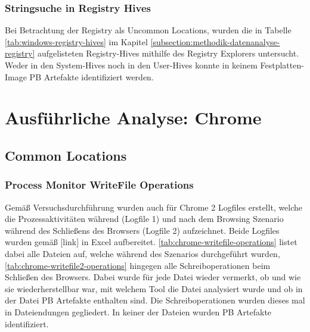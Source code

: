 \begin{appendices}
		
		\subsubsection*{Stringsuche in Registry Hives}
		Bei Betrachtung der Registry als Uncommon Locations, wurden die in Tabelle \ref{tab:windows-registry-hives} im Kapitel \ref{subsection:methodik-datenanalyse-registry} aufgelisteten Registry-Hives mithilfe des Registry Explorers untersucht. 
		Weder in den System-Hives noch in den User-Hives konnte in keinem Festplatten-Image PB Artefakte identifiziert werden. 

\section{Ausführliche Analyse: Chrome}
\subsection{Common Locations}
\label{subsection:appendix-chrome-common-locations}
\subsubsection*{Process Monitor WriteFile Operations}
\label{subsubsection:appendix-chrome-common-locations-writefile-operations}

Gemäß Versuchsdurchführung wurden auch für Chrome 2 Logfiles erstellt, welche die Prozessaktivitäten während (Logfile 1) und nach dem Browsing Szenario während des Schließens des Browsers (Logfile 2) aufzeichnet. Beide Logfiles wurden gemäß [link] in Excel aufbereitet. \autoref{tab:chrome-writefile-operations} listet dabei alle Dateien auf, welche während des Szenarios durchgeführt wurden, \autoref{tab:chrome-writefile2-operations} hingegen alle Schreiboperationen beim Schließen des Browsers. Dabei wurde für jede Datei wieder vermerkt, ob und wie sie wiederherstellbar war, mit welchem Tool die Datei analysiert wurde und ob in der Datei PB Artefakte enthalten sind. Die Schreiboperationen wurden dieses mal in Dateiendungen gegliedert. In keiner der Dateien wurden PB Artefakte identifiziert.


\end{appendices}
